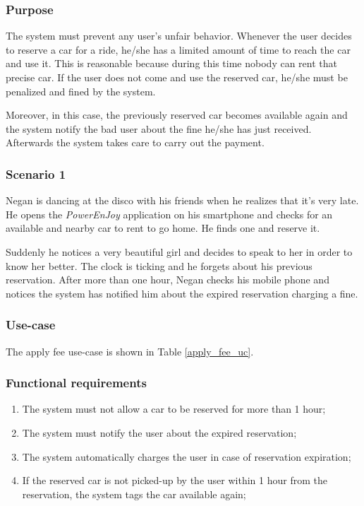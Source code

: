 \subsubsection{Purpose}
The system must prevent any user's unfair behavior. Whenever the user decides to reserve a car for a ride, he/she has a limited amount of time to reach the car and use it. This is reasonable because during this time nobody can rent that precise car. If the user does not come and use the reserved car, he/she must be penalized and fined by the system.

Moreover, in this case, the previously reserved car becomes available again and the system notify the bad user about the fine he/she has just received. Afterwards the system takes care to carry out the payment.

\subsubsection{Scenario 1}
Negan is dancing at the disco with his friends when he realizes that it's very late. He opens the \emph{PowerEnJoy} application on his smartphone and checks for an available and nearby car to rent to go home. He finds one and reserve it.

Suddenly he notices a very beautiful girl and decides to speak to her in order to know her better. The clock is ticking and he forgets about his previous reservation. After more than one hour, Negan checks his mobile phone and notices the system has notified him about the expired reservation charging a fine.

\subsubsection{Use-case}
The apply fee use-case is shown in Table \ref{apply_fee_uc}.

\subsubsection{Functional requirements}
\begin{enumerate}
\item The system must not allow a car to be reserved for more than 1 hour;
\item The system must notify the user about the expired reservation;
\item The system automatically charges the user in case of reservation expiration;
\item If the reserved car is not picked-up by the user within 1 hour from the reservation, the system tags the car available again;
\end{enumerate}

